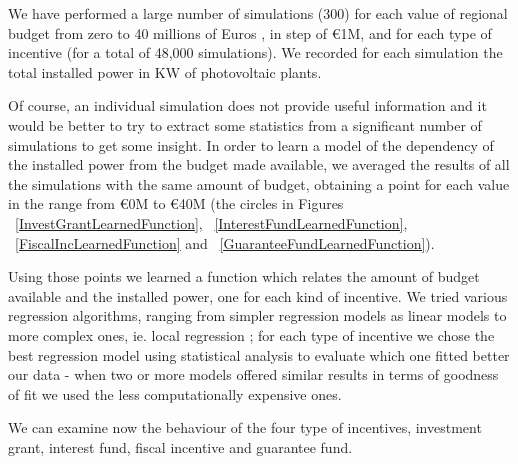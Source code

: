 \documentclass [twocolumn,a4paper,10pt]{ECMS}
\begin{document}
We have performed a large number of simulations (300) for each value of regional budget from zero to 40 millions of Euros , in step of \euro1M, and for each type of incentive (for a total of 48,000 simulations). We recorded for each simulation the total installed power in KW of photovoltaic plants. 

Of course, an individual simulation does not provide useful information and it would be better to try to extract some statistics from a significant number of simulations to get some insight. In order to learn a model of the dependency of the installed power from the budget made available, we averaged the results of all the simulations with the same amount of budget, obtaining a point for each value in the range from \euro0M to \euro40M (the circles in Figures ~\ref{InvestGrantLearnedFunction}, ~\ref{InterestFundLearnedFunction}, ~\ref{FiscalIncLearnedFunction} and ~\ref{GuaranteeFundLearnedFunction}).

Using those points we learned a function which relates the amount of budget available and the installed power, one for each kind of incentive. We tried various regression algorithms, ranging from simpler regression models as linear models \citep{Rousseeuw1987} to more complex ones, ie. local regression \citep{lowess}; for each type of incentive we chose the best regression model using statistical analysis to evaluate which one fitted better our data - when two or more models offered similar results in terms of goodness of fit we used the less computationally expensive ones.

We can examine now the behaviour of the four type of incentives, investment grant, interest fund, fiscal incentive and guarantee fund.


\end{document}
